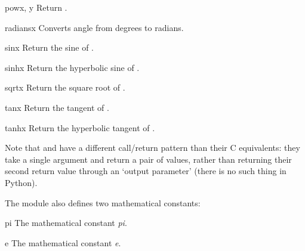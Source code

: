\begin{funcdesc}{pow}{x, y}
Return .
\end{funcdesc}

\begin{funcdesc}{radians}{x}
Converts angle  from degrees to radians.
\end{funcdesc}

\begin{funcdesc}{sin}{x}
Return the sine of .
\end{funcdesc}

\begin{funcdesc}{sinh}{x}
Return the hyperbolic sine of .
\end{funcdesc}

\begin{funcdesc}{sqrt}{x}
Return the square root of .
\end{funcdesc}

\begin{funcdesc}{tan}{x}
Return the tangent of .
\end{funcdesc}

\begin{funcdesc}{tanh}{x}
Return the hyperbolic tangent of .
\end{funcdesc}

Note that  and  have a different
call/return pattern than their C equivalents: they take a single
argument and return a pair of values, rather than returning their
second return value through an `output parameter' (there is no such
thing in Python).

The module also defines two mathematical constants:

\begin{datadesc}{pi}
The mathematical constant \emph{pi}.
\end{datadesc}

\begin{datadesc}{e}
The mathematical constant \emph{e}.
\end{datadesc}

\begin{seealso}
\end{seealso}
